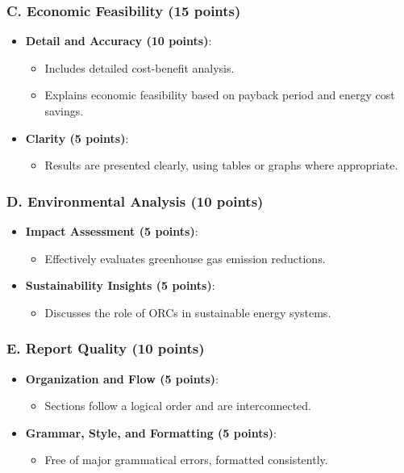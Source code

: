\documentclass[11pt]{article}
\begin{document}
\subsubsection*{C. Economic Feasibility (15 points)}
\begin{itemize}
    \item \textbf{Detail and Accuracy (10 points)}:
    \begin{itemize}
        \item Includes detailed cost-benefit analysis.
        \item Explains economic feasibility based on payback period and energy cost savings.
    \end{itemize}
    \item \textbf{Clarity (5 points)}:
    \begin{itemize}
        \item Results are presented clearly, using tables or graphs where appropriate.
    \end{itemize}
\end{itemize}

\subsubsection*{D. Environmental Analysis (10 points)}
\begin{itemize}
    \item \textbf{Impact Assessment (5 points)}:
    \begin{itemize}
        \item Effectively evaluates greenhouse gas emission reductions.
    \end{itemize}
    \item \textbf{Sustainability Insights (5 points)}:
    \begin{itemize}
        \item Discusses the role of ORCs in sustainable energy systems.
    \end{itemize}
\end{itemize}

\subsubsection*{E. Report Quality (10 points)}
\begin{itemize}
    \item \textbf{Organization and Flow (5 points)}:
    \begin{itemize}
        \item Sections follow a logical order and are interconnected.
    \end{itemize}
    \item \textbf{Grammar, Style, and Formatting (5 points)}:
    \begin{itemize}
        \item Free of major grammatical errors, formatted consistently.
    \end{itemize}
\end{itemize}
\end{document}
